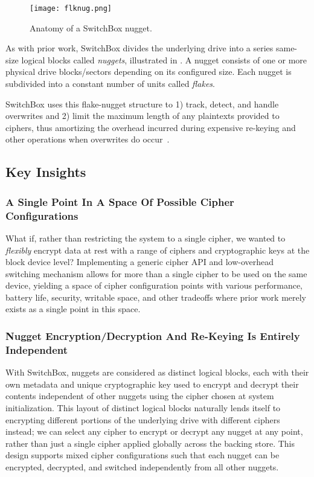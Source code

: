 \begin{figure}[ht]
   \centering
   \texttt{[image: flknug.png]}
   \caption{Anatomy of a SwitchBox nugget.}\label{fig:flknug}
\end{figure}

As with prior work, SwitchBox divides the underlying drive into a series
same-size logical blocks called \emph{nuggets}, illustrated in .
A nugget consists of one or more physical drive blocks/sectors depending on its
configured size. Each nugget is subdivided into a constant number of units
called \emph{flakes}.

SwitchBox uses this flake-nugget structure to 1) track, detect, and handle
overwrites and 2) limit the maximum length of any plaintexts provided to
ciphers, thus amortizing the overhead incurred during expensive re-keying and
other operations when overwrites do occur~\cite{StrongBox}.

\subsection{Key Insights}

\subsubsection{A Single Point In A Space Of Possible Cipher Configurations}

What if, rather than restricting the system to a single cipher, we wanted to
\textit{flexibly} encrypt data at rest with a range of ciphers and cryptographic
keys at the block device level? Implementing a generic cipher API and
low-overhead switching mechanism allows for more than a single cipher to be used
on the same device, yielding a space of cipher configuration points with various
performance, battery life, security, writable space, and other tradeoffs where
prior work merely exists as a single point in this space.

\subsubsection{Nugget Encryption/Decryption And Re-Keying Is Entirely Independent}

With SwitchBox, nuggets are considered as distinct logical blocks, each with
their own metadata and unique cryptographic key used to encrypt and decrypt
their contents independent of other nuggets using the cipher chosen at system
initialization. This layout of distinct logical blocks naturally lends itself to
encrypting different portions of the underlying drive with different ciphers
instead; we can select any cipher to encrypt or decrypt any nugget at any point,
rather than just a single cipher applied globally across the backing store. This
design supports mixed cipher configurations such that each nugget can be encrypted,
decrypted, and switched independently from all other nuggets.

